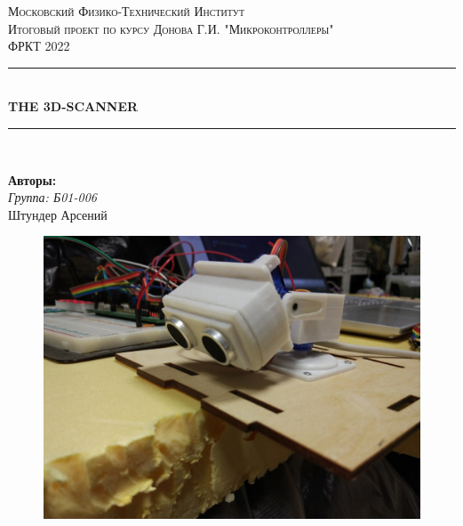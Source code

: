 \documentclass[a4paper, 12pt, twoside]{article}
\begin{document}
\begin{titlepage}

\newcommand{\HRule}{\rule{\linewidth}{0.7mm}} %

\center %
 

\textsc{\LARGE Московский Физико-Технический Институт}\\[1,5cm] %

\textsc{\large Итоговый проект по курсу Донова Г.И. "Микроконтроллеры"} \\[1.0cm] %
\textsc{\LARGE ФРКТ 2022} \\[0.5cm]


\HRule
\\[0.4cm]
{ \huge \bfseries THE 3D-SCANNER}
\\[0.4cm] %
\HRule
\\[0.5cm]


 


	\begin{center} \large

		\textbf{Авторы:}  \\
		\textit{Группа: Б01-006} \\
		Штундер Арсений
	\end{center}

\begin{figure}[h!]
    \centering
    \includegraphics[scale = 0.15]{scan1.jpg}
\end{figure}


\end{titlepage}
\end{document}
